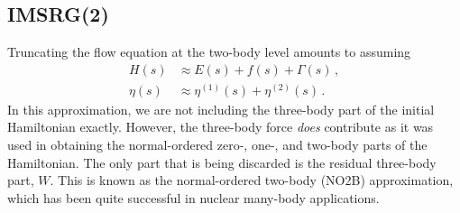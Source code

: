 \subsection{IMSRG(2)}

Truncating the flow equation at the two-body level amounts to assuming
\begin{align}
  H(s)    & \approx E(s) + f(s) + \Gamma(s)\,,       \\
  \eta(s) & \approx \eta^{(1)}(s) + \eta^{(2)}(s)\,.
\end{align}
In this approximation,
we are not including the three-body part of the initial Hamiltonian exactly.
However, the three-body force \textit{does} contribute
as it was used in obtaining the normal-ordered zero-, one-, and two-body parts
of the Hamiltonian.
The only part that is being discarded is the residual three-body part, $W$.
This is known as the normal-ordered two-body (NO2B) approximation,
which has been quite successful in nuclear many-body applications.

